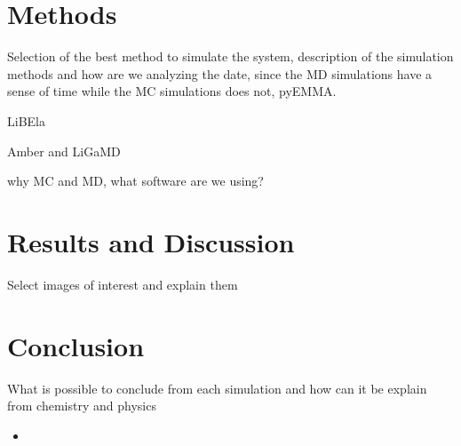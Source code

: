\documentclass[letter,10pt, twocolumn]{article}
\begin{document}
\section{Methods}

Selection of the best method to simulate the system, description of the simulation methods and how are we analyzing the date, since the MD simulations have a sense of time while the MC simulations does not, pyEMMA.

LiBEla 
\cite{libela}


Amber and LiGaMD
\cite{amber}

\cite{ligamd_Miao, ligamd2}

\cite{pyemma}

why MC and MD, what software are we using?


\section{Results and Discussion}

Select images of interest and explain them


\section{Conclusion}

What is possible to conclude from each simulation and how can it be explain from chemistry and physics

\begin{itemize}

\item 

\end{itemize}


\clearpage
\onecolumn{


}
\end{document}
